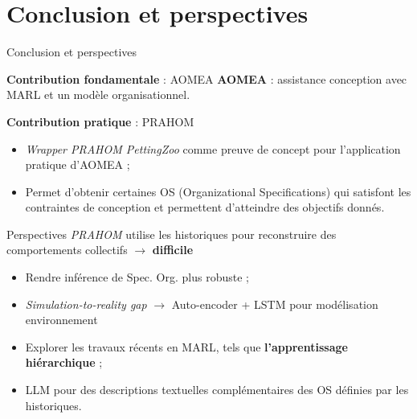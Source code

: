 \section{Conclusion et perspectives}
\begin{frame}{Conclusion et perspectives}
    {}

    \begin{prosblock}{\textbf{Contribution fondamentale} : AOMEA}
        \textbf{AOMEA} : assistance conception avec MARL et un modèle organisationnel.
    \end{prosblock}

    \begin{prosblock}{\textbf{Contribution pratique} : PRAHOM}

        \begin{itemize}
            \item \emph{Wrapper PRAHOM PettingZoo} comme preuve de concept pour l'application pratique d'AOMEA ;
            \item Permet d'obtenir certaines OS (Organizational Specifications) qui satisfont les contraintes de conception et permettent d'atteindre des objectifs donnés.
        \end{itemize}

    \end{prosblock}

    \begin{alertblock}{Perspectives}
        \emph{PRAHOM} utilise les historiques pour reconstruire des comportements collectifs $\rightarrow$ \textbf{difficile}
        \begin{itemize}
            \item Rendre inférence de Spec. Org. plus robuste ;
            \item \textit{Simulation-to-reality gap} $\rightarrow$ Auto-encoder + LSTM pour modélisation environnement
            \item Explorer les travaux récents en MARL, tels que \textbf{l'apprentissage hiérarchique} ;
            \item LLM pour des descriptions textuelles complémentaires des OS définies par les historiques.
        \end{itemize}
    \end{alertblock}

\end{frame}
